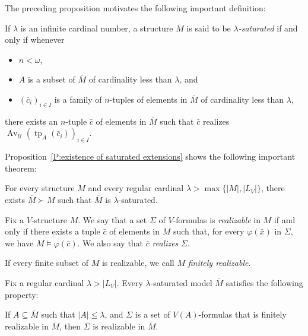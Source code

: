 \documentclass{scrartcl}
\DeclareMathOperator{\Av}{Av }
\DeclareMathOperator{\tp}{tp}
\renewcommand{\phi}{\varphi}
\newcommand{\SU}{\mathscr{U}}
\begin{document}
The preceding proposition motivates the following important definition:

\begin{definition}
\label{D:lambda-saturated}
If $\lambda$ is an infinite cardinal number, a structure $\overline{M}$ is said to be \emph{$\lambda$-saturated} if and only if whenever 
\begin{itemize}
\item
$n<\omega$, 
\item
$A$ is a subset of $\overline{M}$ of cardinality less than $\lambda$, and
\item
$(\bar{c}_i)_{i\in I}$ is a family of $n$-tuples of elements in $\overline{M}$ of cardinality less than $\lambda$,
\end{itemize}
there exists an $n$-tuple $\bar{c}$ of elements in $\overline{M}$ such that $\bar c$ realizes $\Av_{\SU} (\tp_A(\bar c_i))_{i\in I}$.
\end{definition}

Proposition~\ref{P:existence of saturated extensions} shows the following important theorem:

\begin{theorem}
\label{T:existence of lambda-saturated models}
For every structure $M$ and every regular cardinal $\lambda>\max\{|M|,|L_V|\}$, there exists $\overline{M}\succ M$ such that $\overline{M}$ is $\lambda$-saturated.
\end{theorem}


\begin{definition}
Fix a $V$-structure $M$. We say that a set $\Sigma$ of $V$-formulas is \emph{realizable} in $M$ if and only if there exists a tuple $\bar{c}$ of elements in $M$ such that, for every $\phi(\bar{x})$ in $\Sigma$, we have $M\models \phi(\bar{c})$. We also say that $\bar{c}$ \emph{realizes} $\Sigma$.

If every finite subset of $M$ is realizable, we call $M$ \emph{finitely realizable}.
\end{definition}


\begin{corollary}
\label{C:compactness for realizing formulas}
Fix a regular cardinal $\lambda > |L_V|$.
Every $\lambda$-saturated model $\overline{M}$ satisfies the following property:

If $A\subseteq \overline{M}$ such that $|A|\le \lambda$, and $\Sigma$ is a set of $V(A)$-formulas that is finitely realizable in $\overline{M}$,
then $\Sigma$ is realizable in $\overline{M}$.
\end{corollary}
\end{document}
